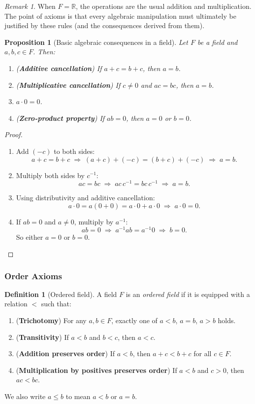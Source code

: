 \documentclass[12pt]{article}
\numberwithin{equation}{section}
\newcommand{\RR}{\mathbb{R}}
\theoremstyle{plain}
\newtheorem{proposition}[theorem]{Proposition}
\theoremstyle{definition}
\newtheorem{definition}[theorem]{Definition}
\theoremstyle{remark}
\newtheorem{remark}[theorem]{Remark}
\begin{document}
\begin{remark}
When $F=\RR$, the operations are the usual addition and multiplication. The point of axioms is that every algebraic manipulation must ultimately be justified by these rules (and the consequences derived from them).
\end{remark}

\begin{proposition}[Basic algebraic consequences in a field]\label{prop:field-basic}
Let $F$ be a field and $a,b,c\in F$. Then:
\begin{enumerate}[label=(\alph*)]
\item (\textbf{Additive cancellation}) If $a+c=b+c$, then $a=b$.
\item (\textbf{Multiplicative cancellation}) If $c\neq 0$ and $ac=bc$, then $a=b$.
\item $a\cdot 0 = 0$.
\item (\textbf{Zero-product property}) If $ab=0$, then $a=0$ or $b=0$.
\end{enumerate}
\end{proposition}

\begin{proof}
\begin{enumerate}[label=(\alph*)]
\item Add $(-c)$ to both sides:
\[
a+c=b+c \;\Rightarrow\; (a+c)+(-c)=(b+c)+(-c)
\;\Rightarrow\; a=b.
\]
\item Multiply both sides by $c^{-1}$:
\[
ac=bc \;\Rightarrow\; ac\,c^{-1}=bc\,c^{-1} \;\Rightarrow\; a=b.
\]
\item Using distributivity and additive cancellation:
\[
a\cdot 0 = a(0+0)=a\cdot 0 + a\cdot 0 \;\Rightarrow\; a\cdot 0 = 0.
\]
\item If $ab=0$ and $a\neq 0$, multiply by $a^{-1}$:
\[
ab=0 \;\Rightarrow\; a^{-1}ab=a^{-1}0 \;\Rightarrow\; b=0.
\]
So either $a=0$ or $b=0$.
\end{enumerate}
\end{proof}

\subsubsection{Order Axioms}

\begin{definition}[Ordered field]
A field $F$ is an \emph{ordered field} if it is equipped with a relation $<$ such that:
\begin{enumerate}[label=(O\arabic*)]
\item (\textbf{Trichotomy}) For any $a,b\in F$, exactly one of $a<b$, $a=b$, $a>b$ holds.
\item (\textbf{Transitivity}) If $a<b$ and $b<c$, then $a<c$.
\item (\textbf{Addition preserves order}) If $a<b$, then $a+c<b+c$ for all $c\in F$.
\item (\textbf{Multiplication by positives preserves order}) If $a<b$ and $c>0$, then $ac<bc$.
\end{enumerate}
We also write $a\le b$ to mean $a<b$ or $a=b$.
\end{definition}
\end{document}
